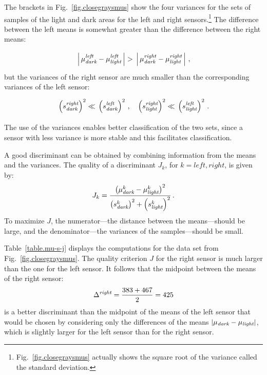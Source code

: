 The brackets in Fig.~\ref{fig.closegraysmus} show the four variances for the sets of samples of the light and dark areas for the left and right sensors.\footnote{Fig.~\ref{fig.closegraysmus} actually shows the square root of the variance called the standard deviation.} The difference between the left means is somewhat greater than the difference between the right means:
\[
\rule[-2ex]{0pt}{6ex}\left|\,\mu_{\sub{dark}}^{\sub{left}}-\mu_{\sub{light}}^{\sub{left}}\,\right| > \rule[-2ex]{0pt}{6ex}\left|\,\mu_{\sub{dark}}^{\sub{right}}-\mu_{\sub{light}}^{\sub{right}}\,\right|\,,
\]
but the variances of the right sensor are much smaller than the corresponding variances of the left sensor:
\[
\rule[-2ex]{0pt}{6ex}\left(s_{\sub{dark}}^{\sub{right}}\right)^2
\ll
\rule[-3ex]{0pt}{6ex}\left(s_{\sub{dark}}^{\sub{left}}\right)^2\,,\;\;\;
\rule[-2ex]{0pt}{6ex}\left(s_{\sub{light}}^{\sub{right}}\right)^2
\ll
\rule[-3ex]{0pt}{6ex}\left(s_{\sub{light}}^{\sub{left}}\right)^2\,.
\]
The use of the variances enables better classification of the two sets, since a sensor with less variance is more stable and this facilitates classification.

A good discriminant can be obtained by combining information from the means and the variances. The quality of a discriminant $J_k$, for $k=\mathit{left},\mathit{right}$, is given by:
\begin{equation}
J_k = \frac{\left(\mu_{\textit{\scriptsize dark}}^k - \mu_{\textit{\scriptsize light}}^k\right)^2}{\left(s_{\textit{\scriptsize dark}}^k\right)^2 + \left(s_{\textit{\scriptsize light}}^k\right)^2}\,.\label{eq.j}
\end{equation}
To maximize $J$, the numerator---the distance between the means---should be large, and the denominator---the variances of the samples---should be small.

Table~\ref{table.mu-s-j} displays the computations for the data set from Fig.~\ref{fig.closegraysmus}. The quality criterion $J$ for the right sensor is much larger than the one for the left sensor. It follows that the midpoint between the means of the right sensor:
\[
\Delta^{\textit{\scriptsize right}}=\frac{383+467}{2}=425
\]
is a better discriminant than the midpoint of the means of the left sensor that would be chosen by considering only the differences of the means $|\mu_{\textit{\scriptsize dark}}-\mu_{\textit{\scriptsize light}}|$, which is slightly larger for the left sensor than for the right sensor.

